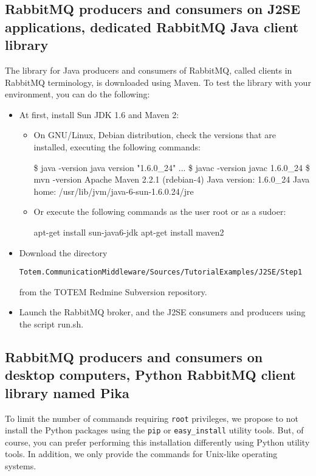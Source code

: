 \subsection{RabbitMQ producers and consumers on J2SE applications,
  dedicated RabbitMQ Java client library}
\label{S_rabbitmq_android_phones}

The library for Java producers and consumers of
\textsf{RabbitMQ}, called clients in \textsf{RabbitMQ} terminology, is 
downloaded using Maven. To test the library with your environment, you can do the following:
\begin{itemize}
\item At first, install Sun JDK 1.6 and Maven 2:
\begin{itemize}
\item On GNU/Linux, Debian distribution, check the versions that are
  installed, executing the following commands:
\begin{shellcmd}
\$ java -version
java version "1.6.0_24"
...
\$ javac -version
javac 1.6.0_24
\$ mvn -version
Apache Maven 2.2.1 (rdebian-4)
Java version: 1.6.0_24
Java home: /usr/lib/jvm/java-6-sun-1.6.0.24/jre
\end{shellcmd}
\item Or execute the following commands as the user \textsf{root} or
  as a \textsf{sudoer}:
\begin{shellcmd}
apt-get install sun-java6-jdk
apt-get install maven2
\end{shellcmd}
\end{itemize}
\item Download the directory  \begin{small}\texttt{Totem.CommunicationMiddleware/Sources/TutorialExamples/J2SE/Step1}\end{small}
from the TOTEM Redmine Subversion repository.
\item Launch the RabbitMQ broker, and the J2SE consumers and producers using the script \textsf{run.sh}.
\end{itemize}

\subsection{RabbitMQ producers and consumers on desktop computers,
  Python RabbitMQ client library named Pika}

To limit the number of commands requiring \texttt{root} privileges, we
propose to not install the Python packages using the \texttt{pip} or
\texttt{easy\_install} utility tools. But, of course, you can prefer
performing this installation differently using Python utility
tools. In addition, we only provide the commands for Unix-like
operating systems.

